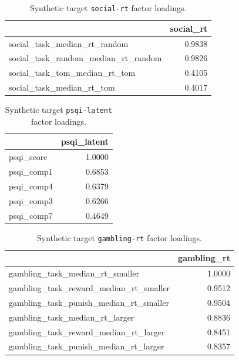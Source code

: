 \documentclass{article}
\begin{document}
\begin{table}[H]
\centering
\begin{tabular}{lr}
\toprule
 & social\_rt \\
\midrule
social\_task\_median\_rt\_random & 0.9838 \\
social\_task\_random\_median\_rt\_random & 0.9826 \\
social\_task\_tom\_median\_rt\_tom & 0.4105 \\
social\_task\_median\_rt\_tom & 0.4017 \\
\bottomrule
\end{tabular}

\footnotesize
\caption{Synthetic target \texttt{social-rt} factor loadings.}
\normalsize
\label{tab:social-rt}
\end{table}


\begin{table}[H]
\centering
\begin{tabular}{lr}
\toprule
 & psqi\_latent \\
\midrule
psqi\_score & 1.0000 \\
psqi\_comp1 & 0.6853 \\
psqi\_comp4 & 0.6379 \\
psqi\_comp3 & 0.6266 \\
psqi\_comp7 & 0.4649 \\
\bottomrule
\end{tabular}

\footnotesize
\caption{Synthetic target \texttt{psqi-latent} factor loadings.}
\normalsize
\label{tab:psqi-latent}
\end{table}


\begin{table}[H]
\centering
\begin{tabular}{lr}
\toprule
 & gambling\_rt \\
\midrule
gambling\_task\_median\_rt\_smaller & 1.0000 \\
gambling\_task\_reward\_median\_rt\_smaller & 0.9512 \\
gambling\_task\_punish\_median\_rt\_smaller & 0.9504 \\
gambling\_task\_median\_rt\_larger & 0.8836 \\
gambling\_task\_reward\_median\_rt\_larger & 0.8451 \\
gambling\_task\_punish\_median\_rt\_larger & 0.8357 \\
\bottomrule
\end{tabular}

\footnotesize
\caption{Synthetic target \texttt{gambling-rt} factor loadings.}
\normalsize
\label{tab:gambling-rt}
\end{table}
\end{document}
